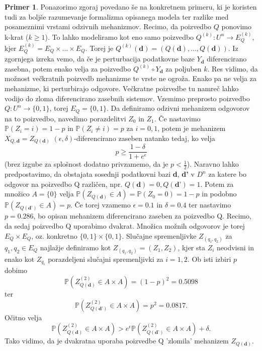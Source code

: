 \documentclass[12pt,a4paper]{amsart}
\theoremstyle{definition} %
\newtheorem{primer}[definicija]{Primer}
\theoremstyle{plain} %
\begin{document}
\begin{primer}
Ponazorimo zgoraj povedano še na konkretnem primeru, ki je koristen tudi za boljše razumevanje formalizma opisanega modela ter razlike med posameznimi vrstami odzivnih mehanizmov. Recimo, da poizvedbo $Q$ ponovimo k-krat ($ k \geq 1$). To lahko modeliramo kot eno samo poizvedbo $Q^{(k)}: U^n \rightarrow E_{Q}^{(k)}$, kjer $E_{Q}^{(k)} = E_Q \times ... \times E_Q$. Torej je $Q^{(k)}(\textbf{d}) = (Q(\textbf{d}), ... , Q(\textbf{d}))$. Iz zgornjega izreka vemo, da če je perturbacija podatkovne baze $Y_{\textbf{d}}$ diferencirano zasebna, potem enako velja za poizvedbo $Q^{(k)} \circ Y_{\textbf{d}}$ za poljuben $k$. Res vidimo, da možnost večkratnih poizvedb mehanizme te vrste ne ogroža.
\newline
\newline
Enako pa ne velja za mehanizme, ki perturbirajo odgovore. Večkratne poizvedbe tu namreč lahko vodijo do zloma diferencirano zasebnih sistemov. Vzemimo preprosto poizvedbo $Q: U^n \rightarrow \{0,1\}$, torej $E_Q = \{0,1\}$. Da definiramo odzivni mehanizem odgovorov na to poizvedbo, navedimo porazdelitvi $Z_0$ in $Z_1$. Če nastavimo $\mathbb{P}(Z_i=i)=1-p$ in $\mathbb{P}(Z_i\neq i)=p$ za $i = 0,1$, potem je mehanizem $X_{Q,\textbf{d}} = Z_{Q(\textbf{d})}$ $(\epsilon, \delta)$-diferencirano zaseben natanko tedaj, ko velja $$p \geq \frac{1-\delta}{1+e^{\epsilon}}$$ (brez izgube za splošnost dodatno privzamemo, da je $p < \frac{1}{2}$).  Naravno lahko predpostavimo, da obstajata sosednji podatkovni bazi \textbf{d}, \textbf{d'} v $D^n$ za katere bo odgovor na poizvedbo Q različen, npr. $Q(\textbf{d})=0, Q(\textbf{d'})=1$. Potem za množico $A = \{0\}$ velja  $\mathbb{P}(Z_{Q(\textbf{d})} \in A) = \mathbb{P}(Z_0 = 0) = 1 - p$ in podobno $\mathbb{P}(Z_{Q(\textbf{d'})} \in A) =  p$. Če torej vzamemo $\epsilon = 0.1$ in $\delta = 0.4$ ter nastavimo $p = 0.286$, bo opisan mehanizem diferencirano zaseben za poizvedbo Q.
 \newline
\newline
Recimo, da sedaj poizvedbo Q uporabimo dvakrat. Množica možnih odgovorov je torej $E_Q \times E_Q$, oz. konkretno $\{0,1\} \times \{0,1\}$. Slučajne spremenljivke $Z_{(q_1, q_2)}$ za $q_1,q_2 \in E_Q$ najlažje definiramo kot $Z_{(q_1, q_2)} = (Z_1, Z_2)$, kjer sta $Z_i$ neodvisni in enako kot $Z_{q_i}$ porazdeljeni slučajni spremenljivki za $i = 1,2$. Ob isti izbiri $p$ dobimo $$\mathbb{P}(Z_{Q(\textbf{d})}^{(2)} \in A \times A) = (1-p)^2 = 0.5098$$ ter $$\mathbb{P}(Z_{Q(\textbf{d'})}^{(2)} \in A \times A) = p^2 = 0.0817.$$ Očitno velja $$\mathbb{P}(Z_{Q(\textbf{d})}^{(2)} \in A \times A) > e^{\epsilon}\mathbb{P}(Z_{Q(\textbf{d'})}^{(2)} \in A \times A) + \delta.$$ Tako vidimo, da je dvakratna uporaba poizvedbe Q 'zlomila' mehanizem $Z_{Q(\textbf{d})}$.
\end{primer}
\end{document}
